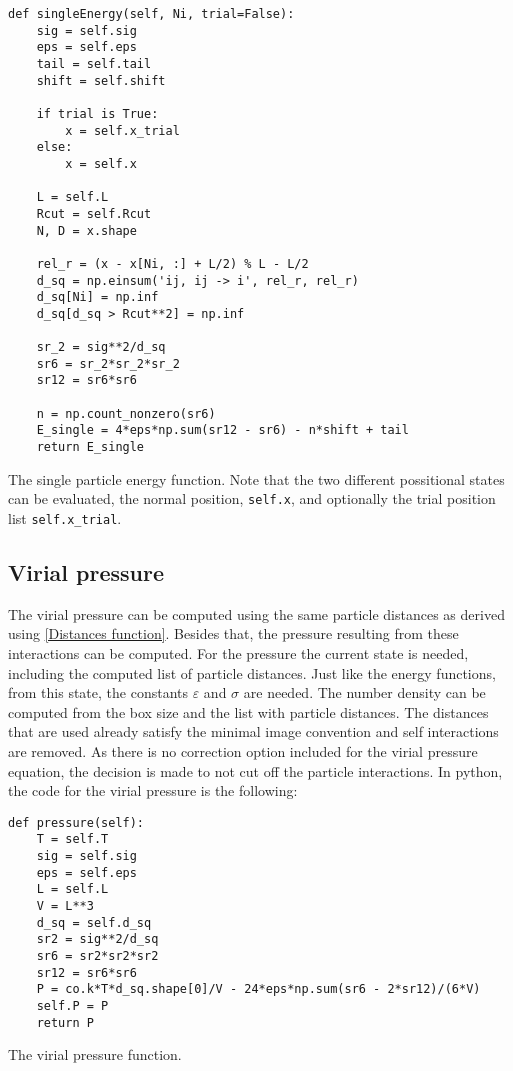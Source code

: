 \begin{listing}[ht!]
	\begin{verbatim}
def singleEnergy(self, Ni, trial=False):
	sig = self.sig
	eps = self.eps
	tail = self.tail
	shift = self.shift
	
	if trial is True:
		x = self.x_trial
	else:
		x = self.x
	
	L = self.L
	Rcut = self.Rcut
	N, D = x.shape
	
	rel_r = (x - x[Ni, :] + L/2) % L - L/2
	d_sq = np.einsum('ij, ij -> i', rel_r, rel_r)
	d_sq[Ni] = np.inf
	d_sq[d_sq > Rcut**2] = np.inf 
	
	sr_2 = sig**2/d_sq
	sr6 = sr_2*sr_2*sr_2
	sr12 = sr6*sr6
	
	n = np.count_nonzero(sr6)
	E_single = 4*eps*np.sum(sr12 - sr6) - n*shift + tail
	return E_single
	\end{verbatim}
\caption{The single particle energy function. Note that the two different possitional states can be evaluated, the normal position, \texttt{self.x}, and optionally the trial position list \texttt{self.x_trial}.}
	\label{Single energy function}
\end{listing}

\subsection{Virial pressure}
The virial pressure can be computed using the same particle distances as derived using \cref{Distances function}. Besides that, the pressure resulting from these interactions can be computed. For the pressure the current state is needed, including the computed list of particle distances. Just like the energy functions, from this state, the constants $\varepsilon$ and $\sigma$ are needed. The number density can be computed from the box size and the list with particle distances. The distances that are used already satisfy the minimal image convention and self interactions are removed. As there is no correction option included for the virial pressure equation, the decision is made to not cut off the particle interactions. In python, the code for the virial pressure is the following:

\begin{listing}[ht!]
	\begin{verbatim}
def pressure(self):
	T = self.T
	sig = self.sig
	eps = self.eps
	L = self.L
	V = L**3
	d_sq = self.d_sq
	sr2 = sig**2/d_sq
	sr6 = sr2*sr2*sr2
	sr12 = sr6*sr6
	P = co.k*T*d_sq.shape[0]/V - 24*eps*np.sum(sr6 - 2*sr12)/(6*V)
	self.P = P
	return P
	\end{verbatim}
\caption{The virial pressure function.}
	\label{Virial pressure function}
\end{listing}

